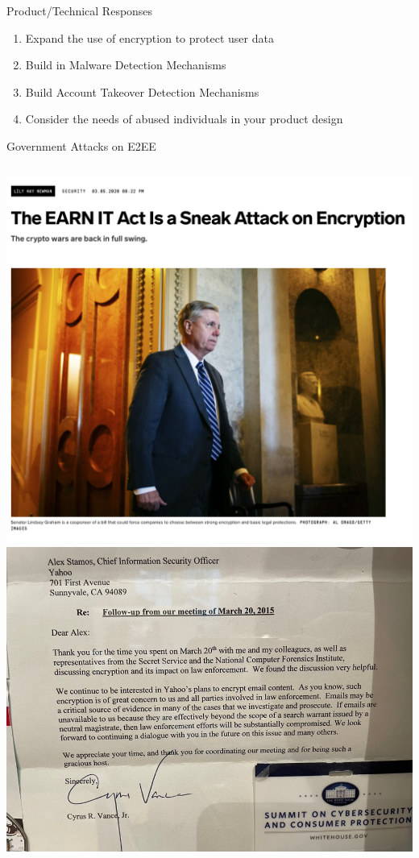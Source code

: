\documentclass[nobackground,dvipsnames,table,aspectratio=169]{beamer}
\begin{document}
\begin{frame}{Product/Technical Responses}
    \begin{enumerate}
        \item Expand the use of encryption to protect user data
        \item Build in Malware Detection Mechanisms
        \item Build Account Takeover Detection Mechanisms
        \item Consider the needs of abused individuals in your product design
    \end{enumerate}
\end{frame}

\begin{frame}{Government Attacks on E2EE}
    \begin{columns}
            \includegraphics[width=\textwidth]{earn-it-wired}
            \includegraphics[width=\textwidth]{encryption-meeting-follow-up}
    \end{columns}
\end{frame}
\end{document}
